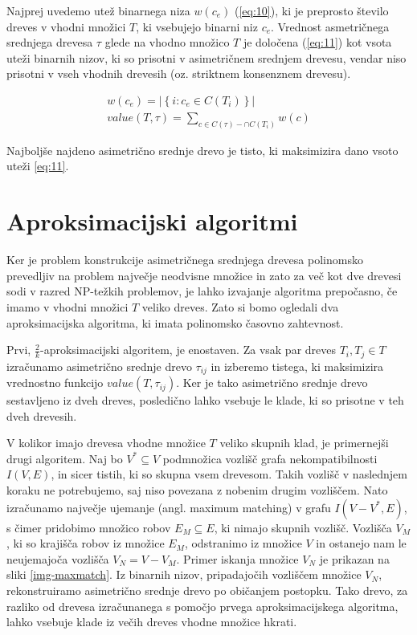 \documentclass[a4paper, 12pt]{book}
\begin{document}
Najprej uvedemo utež binarnega niza $w(c_e)$ (\ref{eq:10}), ki je preprosto število dreves v vhodni množici $T$, ki vsebujejo binarni niz $c_e$. Vrednost asmetričnega srednjega drevesa $\tau$ glede na vhodno množico $T$ je določena (\ref{eq:11}) kot vsota uteži binarnih nizov, ki so prisotni v asimetričnem srednjem drevesu, vendar niso prisotni v vseh vhodnih drevesih (oz. striktnem konsenznem drevesu)\cite{pw}.

\begin{align}
	w(c_e) = \left| \left\{ i: c_e \in C(T_i) \right\} \right| \label{eq:10} \\
	value(T, \tau) = \sum_{c \in C(\tau) - \cap C(T_i)} w(c) \label{eq:11}
\end{align}

Najboljše najdeno asimetrično srednje drevo je tisto, ki maksimizira dano vsoto uteži \ref{eq:11}.

\section{Aproksimacijski algoritmi}
Ker je problem konstrukcije asimetričnega srednjega drevesa polinomsko prevedljiv na problem največje neodvisne množice\cite{pw} in zato za več kot dve drevesi sodi v razred NP-težkih problemov, je lahko izvajanje algoritma prepočasno, če imamo v vhodni množici $T$ veliko dreves. Zato si bomo ogledali dva aproksimacijska algoritma, ki imata polinomsko časovno zahtevnost.

Prvi, $\frac{2}{k}$-aproksimacijski algoritem, je enostaven. Za vsak par dreves $T_i, T_j \in T$ izračunamo asimetrično srednje drevo $\tau_{ij}$ in izberemo tistega, ki maksimizira vrednostno funkcijo $value(T, \tau_{ij})$. Ker je tako asimetrično srednje drevo sestavljeno iz dveh dreves, posledično lahko vsebuje le klade, ki so prisotne v teh dveh drevesih.

V kolikor imajo drevesa vhodne množice $T$ veliko skupnih klad, je primernejši drugi algoritem. Naj bo $V^* \subseteq V$ podmnožica vozlišč grafa nekompatibilnosti $I(V, E)$, in sicer tistih, ki so skupna vsem drevesom. Takih vozlišč v naslednjem koraku ne potrebujemo, saj niso povezana z nobenim drugim vozliščem. Nato izračunamo največje ujemanje (angl. maximum matching) v grafu $I(V - V^*, E)$, s čimer pridobimo množico robov $E_{M} \subseteq E$, ki nimajo skupnih vozlišč\cite{mgt}. Vozlišča $V_{M}$, ki so krajišča robov iz množice $E_{M}$, odstranimo iz množice $V$ in ostanejo nam le neujemajoča vozlišča $V_{N} = V - V_{M}$. Primer iskanja množice $V_N$ je prikazan na sliki \ref{img-maxmatch}. Iz binarnih nizov, pripadajočih vozliščem množice $V_{N}$, rekonstruiramo asimetrično srednje drevo po običanjem postopku. Tako drevo, za razliko od drevesa izračunanega s pomočjo prvega aproksimacijskega algoritma, lahko vsebuje klade iz večih dreves vhodne množice hkrati\cite{pw}. 
\end{document}
